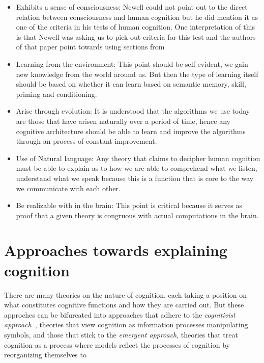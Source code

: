\begin{itemize}
\item Exhibits a sense of consciousness: Newell could not point out to
  the direct relation between consciousness and human cognition but he
  did mention it as one of the criteria in his tests of human
  cognition. One interpretation of
  this~\cite{CambridgeJournals:207162} is that Newell was asking us to
  pick out criteria for this test and the authors of that paper point
  towards using sections from \cite{Cohen:1996aa}

\item Learning from the environment: This point should be self
evident, we gain new knowledge from the world around us. But then
the type of learning itself should be based on whether it can learn based on
semantic memory, skill, priming and conditioning.

\item Arise through evolution: It is understood that the algorithms we
use today are those that have arisen naturally over a period of time,
hence any cognitive architecture should be able to learn and improve
the algorithms through an process of constant improvement.

\item Use of Natural language: Any theory that claims to decipher human
cognition must be able to explain as to how we are able to comprehend
what we listen, understand what we speak because this is a function
that is core to the way we communicate with each other.

\item Be realizable with in the brain: This point is critical because
it serves as proof that a given theory is congruous with actual
computations in the brain.

\end{itemize}
\section{Approaches towards explaining cognition}
    There are many theories on the nature of cognition, each
    taking a position on what constitutes cognitive functions and how
    they are carried out. But these approches can be bifurcated into
    approaches that adhere to the \emph{cognitivist
    approach}~\cite{DBLP:journals/tec/VernonMS07}, theories
    that view cognition as information processes manipulating symbols,
    and those that stick to the \emph{emergent approach}, theories
    that treat cognition as a process where models reflect the
    processes of cognition by reorganizing themselves to 


